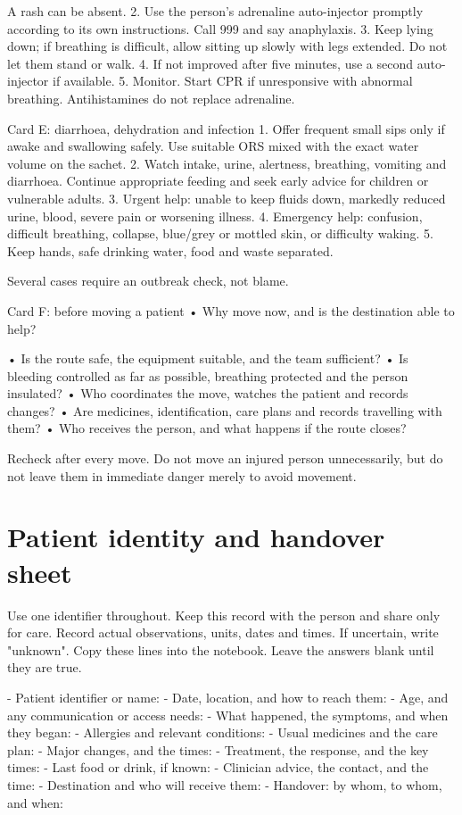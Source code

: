 \documentclass[10pt,openright]{book}
\begin{document}
A rash can be absent. 2. Use the person's adrenaline auto-injector promptly according to its own instructions. Call 999 and say anaphylaxis. 3. Keep lying down; if breathing is difficult, allow sitting up slowly with legs extended. Do not let them stand or walk. 4. If not improved after five minutes, use a second auto-injector if available. 5. Monitor. Start CPR if unresponsive with abnormal breathing. Antihistamines do not replace adrenaline.

Card E: diarrhoea, dehydration and infection 1. Offer frequent small sips only if awake and swallowing safely. Use suitable ORS mixed with the exact water volume on the sachet. 2. Watch intake, urine, alertness, breathing, vomiting and diarrhoea. Continue appropriate feeding and seek early advice for children or vulnerable adults. 3. Urgent help: unable to keep fluids down, markedly reduced urine, blood, severe pain or worsening illness. 4. Emergency help: confusion, difficult breathing, collapse, blue/grey or mottled skin, or difficulty waking. 5. Keep hands, safe drinking water, food and waste separated.

Several cases require an outbreak check, not blame.

Card F: before moving a patient • Why move now, and is the destination able to help?

• Is the route safe, the equipment suitable, and the team sufficient? • Is bleeding controlled as far as possible, breathing protected and the person insulated? • Who coordinates the move, watches the patient and records changes? • Are medicines, identification, care plans and records travelling with them? • Who receives the person, and what happens if the route closes?

Recheck after every move. Do not move an injured person unnecessarily, but do not leave them in immediate danger merely to avoid movement.

\section*{Patient identity and handover sheet}
Use one identifier throughout. Keep this record with the person and share only for care. Record actual observations, units, dates and times. If uncertain, write "unknown". Copy these lines into the notebook. Leave the answers blank until they are true.

- Patient identifier or name: - Date, location, and how to reach them: - Age, and any communication or access needs: - What happened, the symptoms, and when they began: - Allergies and relevant conditions: - Usual medicines and the care plan: - Major changes, and the times: - Treatment, the response, and the key times: - Last food or drink, if known: - Clinician advice, the contact, and the time: - Destination and who will receive them: - Handover: by whom, to whom, and when:
\end{document}
